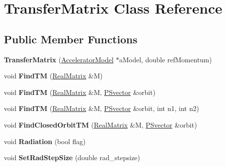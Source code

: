 \hypertarget{classTransferMatrix}{}\section{Transfer\+Matrix Class Reference}
\label{classTransferMatrix}
\subsection*{Public Member Functions}
\begin{DoxyCompactItemize}
\item 
\mbox{\label{classTransferMatrix_a7cf4392072268aa9fd28393a0f1c24a3}} 
{\bfseries Transfer\+Matrix} (\hyperlink{classAcceleratorModel}{Accelerator\+Model} $\ast$a\+Model, double ref\+Momentum)
\item 
\mbox{\label{classTransferMatrix_ace0f1a7d10a6487873503cf36df0bf46}} 
void {\bfseries Find\+TM} (\hyperlink{classTLAS_1_1Matrix}{Real\+Matrix} \&M)
\item 
\mbox{\label{classTransferMatrix_a3df4e209fbd2761de0cbe7689eee012e}} 
void {\bfseries Find\+TM} (\hyperlink{classTLAS_1_1Matrix}{Real\+Matrix} \&M, \hyperlink{classPSvector}{P\+Svector} \&orbit)
\item 
\mbox{\label{classTransferMatrix_a403747a38e25b3168133149520c66b51}} 
void {\bfseries Find\+TM} (\hyperlink{classTLAS_1_1Matrix}{Real\+Matrix} \&M, \hyperlink{classPSvector}{P\+Svector} \&orbit, int n1, int n2)
\item 
\mbox{\label{classTransferMatrix_ad61334b0eaa87c9537934c9fbb537aa6}} 
void {\bfseries Find\+Closed\+Orbit\+TM} (\hyperlink{classTLAS_1_1Matrix}{Real\+Matrix} \&M, \hyperlink{classPSvector}{P\+Svector} \&orbit)
\item 
\mbox{\label{classTransferMatrix_a22cf41fee4239543acb1205ab8beff53}} 
void {\bfseries Radiation} (bool flag)
\item 
\mbox{\label{classTransferMatrix_a1d797e7544f14700a1db2ba1f8fd58c4}} 
void {\bfseries Set\+Rad\+Step\+Size} (double rad\+\_\+stepsize)
\item 

\end{DoxyCompactItemize}
